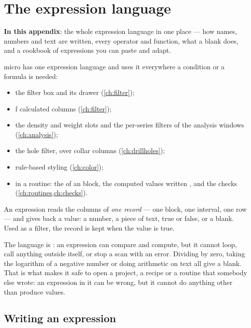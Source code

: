 \chapter{The expression language}\label{app:expr}\label{ch:expr}

\begin{goals}
\textbf{In this appendix}: the whole expression language in one place — how names, numbers and text
are written, every operator and function, what a blank does, and a cookbook of expressions you can
paste and adapt.
\end{goals}

micro has one expression language and uses it everywhere a condition or a formula is needed:

\begin{itemize}
\item the filter box and its drawer (\cref{ch:filter});
\item ƒ calculated columns (\cref{ch:filter});
\item the density and weight slots and the per-series filters of the analysis windows
  (\cref{ch:analysis});
\item the hole filter, over collar columns (\cref{ch:drillholes});
\item rule-based styling (\cref{ch:color});
\item in a routine: the  of an  block, the computed values written
  , and the checks (\cref{ch:routines,ch:checks}).
\end{itemize}

An expression reads the columns of \emph{one record} — one block, one interval, one row — and
gives back a value: a number, a piece of text, true or false, or a blank. Used as a filter, the
record is kept when the value is true.

\begin{why}
The language is : an expression can compare and compute, but it cannot loop, call
anything outside itself, or stop a scan with an error. Dividing by zero, taking the logarithm of a
negative number or doing arithmetic on text all give a blank. That is what makes it safe to open a
project, a recipe or a routine that somebody else wrote: an expression in it can be wrong, but it
cannot do anything other than produce values.
\end{why}

\section{Writing an expression}\label{sec:expr-syntax}

